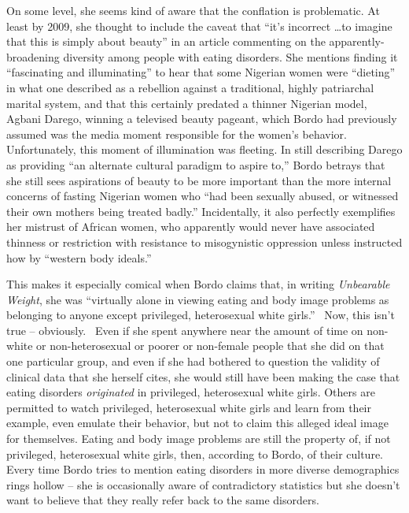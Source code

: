 \documentclass[11pt]{article}
\begin{document}
    On some level, she seems kind of aware that the conflation is problematic. At least by 2009, she thought to include the caveat that ``it's incorrect \dots to imagine that this is simply about beauty'' in an article commenting on the apparently-broadening diversity among people with eating disorders. She mentions finding it ``fascinating and illuminating'' to hear that some Nigerian women were ``dieting'' in what one described as a rebellion against a traditional, highly patriarchal marital system, and that this certainly predated a thinner Nigerian model, Agbani Darego, winning a televised beauty pageant, which Bordo had previously assumed was the media moment responsible for the women's behavior. Unfortunately, this moment of illumination was fleeting. In still describing Darego as providing ``an alternate cultural paradigm to aspire to,'' Bordo betrays that she still sees aspirations of beauty to be more important than the more internal concerns of fasting Nigerian women who ``had been sexually abused, or witnessed their own mothers being treated badly.'' Incidentally, it also perfectly exemplifies her mistrust of African women, who apparently would never have associated thinness or restriction with resistance to misogynistic oppression unless instructed how by ``western body ideals.''~\autocite[270-271]{Bordo09}

    This makes it especially comical when Bordo claims that, in writing \textit{Unbearable Weight}, she was ``virtually alone in viewing eating and body image problems as belonging to anyone except privileged, heterosexual white girls.''~\autocite[266]{Bordo09} Now, this isn't true -- obviously.~\autocites[Certainly in the medical sphere -- aside from Schneider and Agras above, see][]{Yager87}[see][-- but also in widespread discourse]{StriegelMoore90}[see][204, for a surprisingly nuanced discussion of body image in relation to social class]{Bourdieu84}[see][for a popular magazine article comparing various body image perceptions between men and women as well as between age groups -- and even in fiction]{Cash86}[see][a novel about, in part, a Zimbabwean girl suffering from bulimia and the relationship between her disorder and colonialism which is far more complex than viewing it as an internalized ``western body ideal.'' All of these predate \textit{Unbearable Weight} by several years.]{Dangarembga88} Even if she spent anywhere near the amount of time on non-white or non-heterosexual or poorer or non-female people that she did on that one particular group, and even if she had bothered to question the validity of clinical data that she herself cites, she would still have been making the case that eating disorders \textit{originated} in privileged, heterosexual white girls. Others are permitted to watch privileged, heterosexual white girls and learn from their example, even emulate their behavior, but not to claim this alleged ideal image for themselves. Eating and body image problems are still the property of, if not privileged, heterosexual white girls, then, according to Bordo, of their culture. Every time Bordo tries to mention eating disorders in more diverse demographics rings hollow -- she is occasionally aware of contradictory statistics but she doesn't want to believe that they really refer back to the same disorders. 
\end{document}
